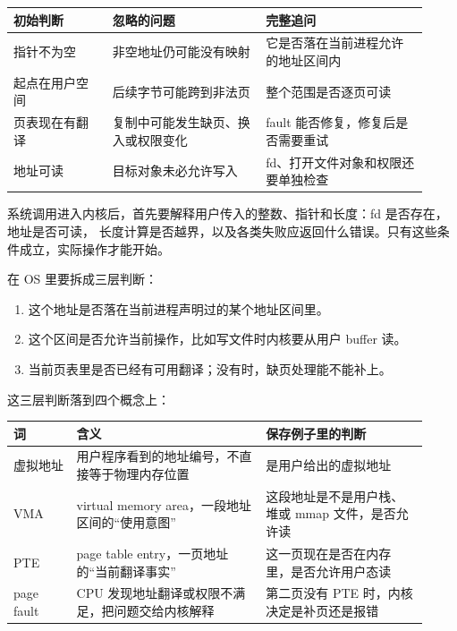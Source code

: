 \begin{longtable}{|L{0.22\linewidth}|L{0.34\linewidth}|L{0.36\linewidth}|}
\toprule
初始判断 & 忽略的问题 & 完整追问 \\
\midrule
指针不为空 & 非空地址仍可能没有映射 & 它是否落在当前进程允许的地址区间内 \\\tablerowrule
起点在用户空间 & 后续字节可能跨到非法页 & 整个范围是否逐页可读 \\\tablerowrule
页表现在有翻译 & 复制中可能发生缺页、换入或权限变化 & fault 能否修复，修复后是否需要重试 \\\tablerowrule
地址可读 & 目标对象未必允许写入 & fd、打开文件对象和权限还要单独检查 \\
\bottomrule
\end{longtable}

\begin{keyidea}
系统调用进入内核后，首先要解释用户传入的整数、指针和长度：fd 是否存在，地址是否可读，
长度计算是否越界，以及各类失败应返回什么错误。只有这些条件成立，实际操作才能开始。
\end{keyidea}

 在 OS 里要拆成三层判断：

\begin{enumerate}
\tightlist
\item 这个地址是否落在当前进程声明过的某个地址区间里。
\item 这个区间是否允许当前操作，比如写文件时内核要从用户 buffer 读。
\item 当前页表里是否已经有可用翻译；没有时，缺页处理能不能补上。
\end{enumerate}

这三层判断落到四个概念上：

\begin{longtable}{|L{0.14\linewidth}|L{0.42\linewidth}|L{0.36\linewidth}|}
\toprule
词 & 含义 & 保存例子里的判断 \\
\midrule
虚拟地址 & 用户程序看到的地址编号，不直接等于物理内存位置 &  是用户给出的虚拟地址 \\\tablerowrule
VMA & virtual memory area，一段地址区间的“使用意图” & 这段地址是不是用户栈、堆或 mmap 文件，是否允许读 \\\tablerowrule
PTE & page table entry，一页地址的“当前翻译事实” & 这一页现在是否在内存里，是否允许用户态读 \\\tablerowrule
page fault & CPU 发现地址翻译或权限不满足，把问题交给内核解释 & 第二页没有 PTE 时，内核决定是补页还是报错 \\
\bottomrule
\end{longtable}

